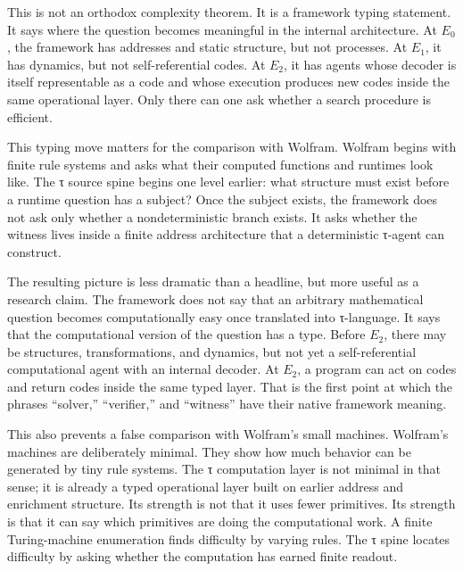 \documentclass{pantarhei-researchnote}
\newcommand{\Ezero}{\ensuremath{E_0}}
\newcommand{\Eone}{\ensuremath{E_1}}
\newcommand{\Etwo}{\ensuremath{E_2}}
\begin{document}
This is not an orthodox complexity theorem. It is a framework typing
statement. It says where the question becomes meaningful in the internal
architecture. At \Ezero, the framework has addresses and static structure,
but not processes. At \Eone, it has dynamics, but not self-referential
codes. At \Etwo, it has agents whose decoder is itself representable as a
code and whose execution produces new codes inside the same operational
layer. Only there can one ask whether a search procedure is efficient.

This typing move matters for the comparison with Wolfram. Wolfram begins
with finite rule systems and asks what their computed functions and
runtimes look like. The τ source spine begins one level earlier: what
structure must exist before a runtime question has a subject? Once the
subject exists, the framework does not ask only whether a nondeterministic
branch exists. It asks whether the witness lives inside a finite address
architecture that a deterministic τ-agent can construct.

The resulting picture is less dramatic than a headline, but more useful
as a research claim. The framework does not say that an arbitrary
mathematical question becomes computationally easy once translated into
τ-language. It says that the computational version of the question has a
type. Before \Etwo, there may be structures, transformations, and
dynamics, but not yet a self-referential computational agent with an
internal decoder. At \Etwo, a program can act on codes and return codes
inside the same typed layer. That is the first point at which the
phrases ``solver,'' ``verifier,'' and ``witness'' have their native
framework meaning.

This also prevents a false comparison with Wolfram's small machines.
Wolfram's machines are deliberately minimal. They show how much behavior
can be generated by tiny rule systems. The τ computation layer is not
minimal in that sense; it is already a typed operational layer built on
earlier address and enrichment structure. Its strength is not that it
uses fewer primitives. Its strength is that it can say which primitives
are doing the computational work. A finite Turing-machine enumeration
finds difficulty by varying rules. The τ spine locates difficulty by
asking whether the computation has earned finite readout.
\end{document}

